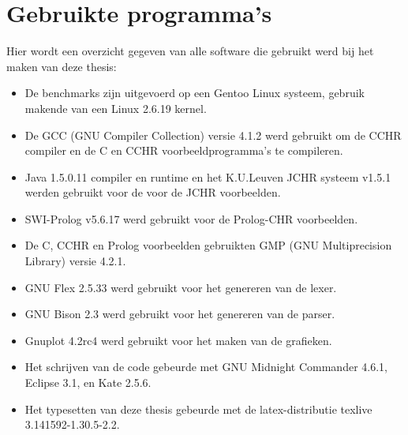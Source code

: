 \chapter{Gebruikte programma's} \label{chap:progs}

Hier wordt een overzicht gegeven van alle software die gebruikt werd bij het maken van deze thesis: \begin{itemize}
\item De benchmarks zijn uitgevoerd op een Gentoo Linux systeem, gebruik makende van een Linux 2.6.19 kernel.
\item De GCC (GNU Compiler Collection) versie 4.1.2 werd gebruikt om de CCHR compiler en de C en CCHR voorbeeldprogramma's te compileren.
\item Java 1.5.0.11 compiler en runtime en het K.U.Leuven JCHR systeem v1.5.1 werden gebruikt voor de voor de JCHR voorbeelden.
\item SWI-Prolog v5.6.17 werd gebruikt voor de Prolog-CHR voorbeelden.
\item De C, CCHR en Prolog voorbeelden gebruikten GMP (GNU Multiprecision Library) versie 4.2.1.
\item GNU Flex 2.5.33 werd gebruikt voor het genereren van de lexer.
\item GNU Bison 2.3 werd gebruikt voor het genereren van de parser.
\item Gnuplot 4.2rc4 werd gebruikt voor het maken van de grafieken.
\item Het schrijven van de code gebeurde met GNU Midnight Commander 4.6.1, Eclipse 3.1, en Kate 2.5.6.
\item Het typesetten van deze thesis gebeurde met de latex-distributie texlive 3.141592-1.30.5-2.2.
\end{itemize}
